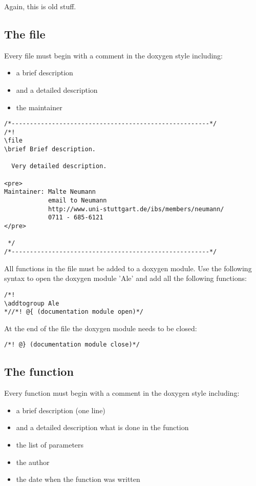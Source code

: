Again, this is old stuff.

\subsection{The file}

Every file must begin with a comment in the doxygen style including: 

\begin{itemize}
\item a brief description
\item and a detailed description
\item the maintainer
\end{itemize}

\begin{verbatim}
/*------------------------------------------------------*/
/*!
\file
\brief Brief description.

  Very detailed description.

<pre>
Maintainer: Malte Neumann
            email to Neumann
            http://www.uni-stuttgart.de/ibs/members/neumann/
            0711 - 685-6121
</pre>

 */
/*------------------------------------------------------*/
\end{verbatim}

All functions in the file must be added to a doxygen module. Use the
following syntax to open the doxygen module 'Ale' and add all the
following functions:

\begin{verbatim}
/*!
\addtogroup Ale
*//*! @{ (documentation module open)*/
\end{verbatim}

 At the end of the file the doxygen module needs to be closed: 

\begin{verbatim}
/*! @} (documentation module close)*/
\end{verbatim}

\subsection{The function}

Every function must begin with a comment in the doxygen style including: 

\begin{itemize}
\item a brief description (one line)
\item and a detailed description what is done in the function
\item the list of parameters
\item the author
\item the date when the function was written
\end{itemize}

